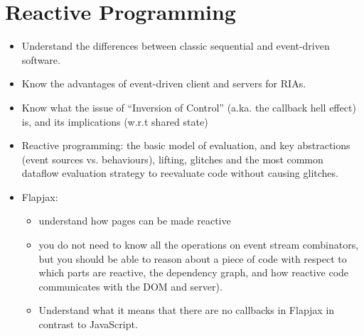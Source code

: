 \documentclass[a4paper]{report}
\begin{document}
\chapter{Reactive Programming}
\begin{itemize}
  \item Understand the differences between classic sequential and event-driven software.
  \item Know the advantages of event-driven client and servers for RIAs.
  \item Know what the issue of “Inversion of Control” (a.ka. the callback hell effect) is, and its
  implications (w.r.t shared state)
  \item Reactive programming: the basic model of evaluation, and key abstractions (event
  sources vs. behaviours), lifting, glitches and the most common dataflow evaluation
  strategy to reevaluate code without causing glitches.
  \item Flapjax:
  \begin{itemize}
    \item understand how pages can be made reactive
    \item you do not need to know all the operations on event stream combinators, but you
    should be able to reason about a piece of code with respect to which parts are
    reactive, the dependency graph, and how reactive code communicates with the
    DOM and server).
    \item Understand what it means that there are no callbacks in Flapjax in contrast to
    JavaScript.
  \end{itemize}
\end{itemize}
\end{document}
